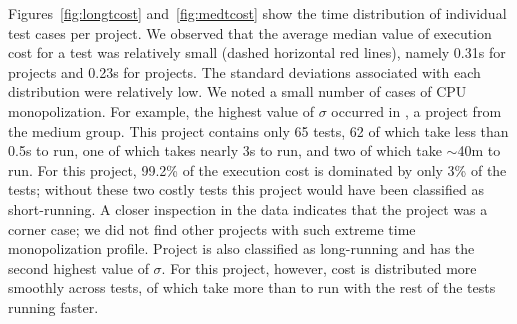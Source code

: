 \sloppy Figures~\ref{fig:longtcost} and~\ref{fig:medtcost} show the
time distribution of individual test cases per project.  We observed
that the average median value of execution cost for a test was
relatively small (dashed horizontal red lines), namely 0.31s for
\medg{} projects and 0.23s for \longg{} projects.  The standard
deviations associated with each distribution were relatively
low.  We noted a small number of
cases of CPU monopolization.  For example, the highest value of
$\sigma$ occurred in , a project from the
medium group.  This project contains only 65 tests, 62 of which take
less than 0.5s to run, one of which takes nearly 3s to run, and two of
which take $\sim$40m to run.  For this project, 99.2\% of the
execution cost is dominated by only 3\% of the tests; without these
two costly tests this project would have been classified as
short-running.  A closer inspection in the data indicates that the
project  was a corner case; we did not find
other projects with such extreme time monopolization profile.  Project
 is also classified as long-running
and has the second highest value of $\sigma$.  For this project,
however, cost is distributed more smoothly across  tests, of
which  take more than  to run with the rest of
the tests running faster.

